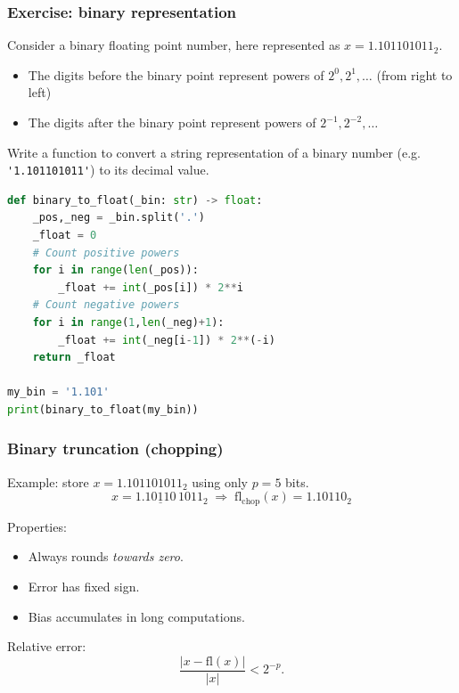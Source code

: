 \begin{frame}[fragile]
  \frametitle{Exercise: binary representation}

  Consider a binary floating point number, here represented as $x = 1.101101011_2$.
  \begin{itemize}
    \item The digits before the binary point represent powers of $2^0, 2^1, \ldots$ (from right to left)
    \item The digits after the binary point represent powers of $2^{-1}, 2^{-2}, \ldots$
  \end{itemize}

  Write a function to convert a string representation of a binary number (e.g. \lstinline|'1.101101011'|) to its decimal value.

    \pause
  
    \begin{lstlisting}[language=Python]
def binary_to_float(_bin: str) -> float:
    _pos,_neg = _bin.split('.')
    _float = 0
    # Count positive powers
    for i in range(len(_pos)):
        _float += int(_pos[i]) * 2**i
    # Count negative powers
    for i in range(1,len(_neg)+1):
        _float += int(_neg[i-1]) * 2**(-i)
    return _float

my_bin = '1.101'
print(binary_to_float(my_bin))
    \end{lstlisting}

\end{frame}

\begin{frame}
  \frametitle{Binary truncation (chopping)}

  Example: store $x = 1.101101011_2$ using only $p=5$ bits.
  \[
    x = 1.\underline{10110}\,1011_2
    \;\Rightarrow\;
    \mathrm{fl}_{\text{chop}}(x) = 1.10110_2
  \]

  Properties:
  \begin{itemize}
    \item Always rounds \emph{towards zero}.
    \item Error has fixed sign.
    \item Bias accumulates in long computations.
  \end{itemize}

  Relative error:
  \[
    \frac{|x-\mathrm{fl}(x)|}{|x|} < 2^{-p}.
  \]
\end{frame}

